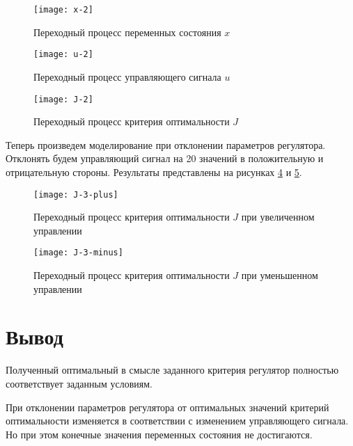 \documentclass[14pt, a4paper]{extarticle}
\begin{document}
	\begin{figure}[H]
		\centering
		\texttt{[image: x-2]}
		\caption{Переходный процесс переменных состояния $x$}
		\label{fig:x-2}
	\end{figure}

	\begin{figure}[H]
		\centering
		\texttt{[image: u-2]}
		\caption{Переходный процесс управляющего сигнала $u$}
		\label{fig:u-2}
	\end{figure}

	\begin{figure}[H]
		\centering
		\texttt{[image: J-2]}
		\caption{Переходный процесс критерия оптимальности $J$}
		\label{fig:J-2}
	\end{figure}	
	
	Теперь произведем моделирование при отклонении параметров регулятора. Отклонять будем управляющий сигнал на 20 значений в положительную и отрицательную стороны. Результаты представлены на рисунках \ref{fig:J-3-plus} и \ref{fig:J-3-minus}.
	
	\begin{figure}[H]
		\centering
		\texttt{[image: J-3-plus]}
		\caption{Переходный процесс критерия оптимальности $J$ при увеличенном управлении}
		\label{fig:J-3-plus}
	\end{figure}

	\begin{figure}[H]
		\centering
		\texttt{[image: J-3-minus]}
		\caption{Переходный процесс критерия оптимальности $J$ при уменьшенном управлении}
		\label{fig:J-3-minus}
	\end{figure}
	
	\newpage
	
	\section*{Вывод}
	
	Полученный оптимальный в смысле заданного критерия регулятор полностью соответствует заданным условиям.
	
	При отклонении параметров регулятора от оптимальных значений критерий оптимальности изменяется в соответствии с изменением управляющего сигнала. Но при этом конечные значения переменных состояния не достигаются.
	
\end{document}
